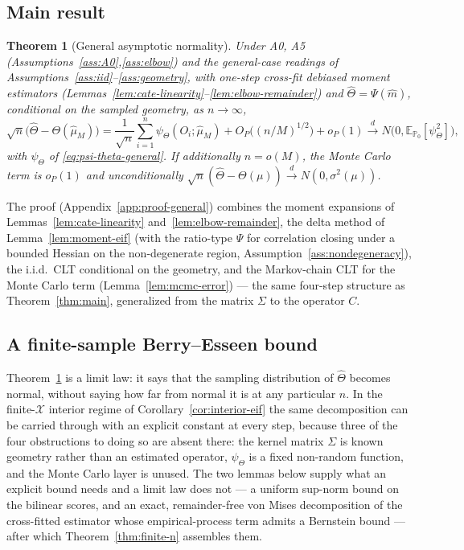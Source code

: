 \documentclass[11pt]{article}
\theoremstyle{plain}
\newtheorem{theorem}{Theorem}[section]
\theoremstyle{definition}
\theoremstyle{remark}
\newcommand{\E}{\mathbb{E}}
\newcommand{\PP}{\mathbb{P}}
\newcommand{\cX}{\mathcal{X}}
\newcommand{\Qhat}{\widehat{\mu}_M}
\begin{document}
\subsection{Main result}

\begin{theorem}[General asymptotic normality]\label{thm:general}
Under A0, A5 (Assumptions~\ref{ass:A0},\ref{ass:elbow}) and the general-case readings
of Assumptions~\ref{ass:iid}--\ref{ass:geometry}, with one-step cross-fit debiased
moment estimators (Lemmas~\ref{lem:cate-linearity}--\ref{lem:elbow-remainder}) and
$\hat\Theta=\Psi(\hat m)$, conditional on the sampled geometry, as $n\to\infty$,
\begin{equation}\label{eq:thm-general}
    \sqrt n\big(\hat\Theta-\Theta(\Qhat)\big)
    = \frac1{\sqrt n}\sum_{i=1}^n\psi_\Theta(O_i;\Qhat) + O_P\big((n/M)^{1/2}\big) + o_P(1)
    \xrightarrow{d} N\big(0,\E_{\PP_0}[\psi_\Theta^2]\big),
\end{equation}
with $\psi_\Theta$ of \eqref{eq:psi-theta-general}. If additionally $n=o(M)$, the
Monte Carlo term is $o_P(1)$ and unconditionally
$\sqrt n(\hat\Theta-\Theta(\mu))\xrightarrow{d}N(0,\sigma^2(\mu))$.
\end{theorem}

The proof (Appendix~\ref{app:proof-general}) combines the moment expansions of
Lemmas~\ref{lem:cate-linearity} and~\ref{lem:elbow-remainder}, the delta method of
Lemma~\ref{lem:moment-eif} (with the ratio-type $\Psi$ for correlation closing under a
bounded Hessian on the non-degenerate region, Assumption~\ref{ass:nondegeneracy}), the
i.i.d.\ CLT conditional on the geometry, and the Markov-chain CLT for the Monte Carlo
term (Lemma~\ref{lem:mcmc-error}) --- the same four-step structure as
Theorem~\ref{thm:main}, generalized from the matrix $\Sigma$ to the operator $C$.

\subsection{A finite-sample Berry--Esseen bound}\label{sec:finite-n}

Theorem~\ref{thm:general} is a limit law: it says that the sampling distribution of
$\hat\Theta$ becomes normal, without saying how far from normal it is at any particular
$n$. In the finite-$\cX$ interior regime of Corollary~\ref{cor:interior-eif} the same
decomposition can be carried through with an explicit constant at every step, because
three of the four obstructions to doing so are absent there: the kernel matrix $\Sigma$
is known geometry rather than an estimated operator, $\psi_\Theta$ is a fixed non-random
function, and the Monte Carlo layer is unused. The two lemmas below supply what an
explicit bound needs and a limit law does not --- a uniform sup-norm bound on the
bilinear scores, and an exact, remainder-free von Mises decomposition of the
cross-fitted estimator whose empirical-process term admits a Bernstein bound ---
after which Theorem~\ref{thm:finite-n} assembles them.
\end{document}
